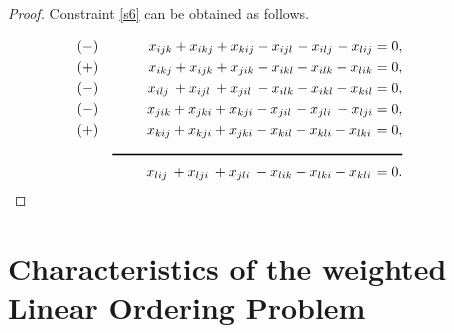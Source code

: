 \begin{proof}
	Constraint \ref{s6} can be obtained as follows.
	
	\begin{align*}
	&(-) &x_{ijk} + x_{ikj} + x_{kij} - x_{ijl} \hspace{1 pt}- x_{ilj} \hspace{1 pt}- x_{lij} = 0, \hspace{19 pt}\\
	&(+) &x_{ikj} + x_{ijk} + x_{jik} - x_{ikl} - x_{ilk} - x_{lik} = 0, \hspace{19 pt} \\
	&(-) &x_{ilj} \hspace{2 pt}+ x_{ijl} \hspace{2 pt}+ x_{jil}\hspace{2 pt} - x_{ilk} - x_{ikl} - x_{kil} = 0, \hspace{19 pt}\\
	&(-) &x_{jik} + x_{jki} + x_{kji} - x_{jil} \hspace{1 pt}- x_{jli} \hspace{2 pt}- x_{lji} = 0, \hspace{19 pt}\\
	&(+) &x_{kij} + x_{kji} + x_{jki} - x_{kil} - x_{kli} - x_{lki} \hspace{1 pt}= 0, \hspace{19 pt}\\
	& &\rule{7.3 cm}{1 pt} \hspace{19 pt}&&\\
	& &x_{lij} \hspace{2 pt}+ x_{lji} \hspace{2 pt}+ x_{jli} \hspace{2 pt}- x_{lik} - x_{lki} - x_{kli} \hspace{1 pt}= 0. \hspace{19 pt}
	\end{align*}
\end{proof}
\newpage
\section{Characteristics of the weighted Linear Ordering Problem}\label{char}

